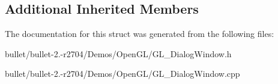 \subsection*{Additional Inherited Members}


The documentation for this struct was generated from the following files\+:\begin{DoxyCompactItemize}
\item 
bullet/bullet-\/2.-\/r2704/\+Demos/\+Open\+G\+L/G\+L\+\_\+\+Dialog\+Window.\+h\item 
bullet/bullet-\/2.-\/r2704/\+Demos/\+Open\+G\+L/G\+L\+\_\+\+Dialog\+Window.\+cpp\end{DoxyCompactItemize}
